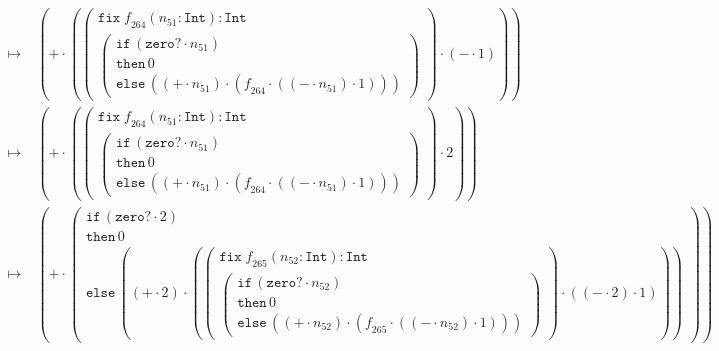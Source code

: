 \documentclass{article}
\begin{document}
\begin{align*}
\longmapsto &\;\left(\mathtt{+}\cdot \left(\left(\begin{array}{l} \mathtt{fix}\; \mathit{f}_{264}(\mathit{n}_{51}:\mathtt{Int}): \mathtt{Int}\\\left(\begin{array}{l}\mathtt{if}\,\left(\mathtt{zero?}\cdot \mathit{n}_{51}\right)\\\mathtt{then}\,0\\\mathtt{else}\,\left(\left(\mathtt{+}\cdot \mathit{n}_{51}\right)\cdot \left(\mathit{f}_{264}\cdot \left(\left(\mathtt{-}\cdot \mathit{n}_{51}\right)\cdot 1\right)\right)\right)\end{array}\right)\end{array}\right)\cdot \left(\mathtt{-}\cdot 1\right)\right)\right)\\ 
\longmapsto &\;\left(\mathtt{+}\cdot \left(\left(\begin{array}{l} \mathtt{fix}\; \mathit{f}_{264}(\mathit{n}_{51}:\mathtt{Int}): \mathtt{Int}\\\left(\begin{array}{l}\mathtt{if}\,\left(\mathtt{zero?}\cdot \mathit{n}_{51}\right)\\\mathtt{then}\,0\\\mathtt{else}\,\left(\left(\mathtt{+}\cdot \mathit{n}_{51}\right)\cdot \left(\mathit{f}_{264}\cdot \left(\left(\mathtt{-}\cdot \mathit{n}_{51}\right)\cdot 1\right)\right)\right)\end{array}\right)\end{array}\right)\cdot 2\right)\right)\\ 
\longmapsto &\;\left(\mathtt{+}\cdot \left(\begin{array}{l}\mathtt{if}\,\left(\mathtt{zero?}\cdot 2\right)\\\mathtt{then}\,0\\\mathtt{else}\,\left(\left(\mathtt{+}\cdot 2\right)\cdot \left(\left(\begin{array}{l} \mathtt{fix}\; \mathit{f}_{265}(\mathit{n}_{52}:\mathtt{Int}): \mathtt{Int}\\\left(\begin{array}{l}\mathtt{if}\,\left(\mathtt{zero?}\cdot \mathit{n}_{52}\right)\\\mathtt{then}\,0\\\mathtt{else}\,\left(\left(\mathtt{+}\cdot \mathit{n}_{52}\right)\cdot \left(\mathit{f}_{265}\cdot \left(\left(\mathtt{-}\cdot \mathit{n}_{52}\right)\cdot 1\right)\right)\right)\end{array}\right)\end{array}\right)\cdot \left(\left(\mathtt{-}\cdot 2\right)\cdot 1\right)\right)\right)\end{array}\right)\right)\\ 

\end{align*}
\end{document}
